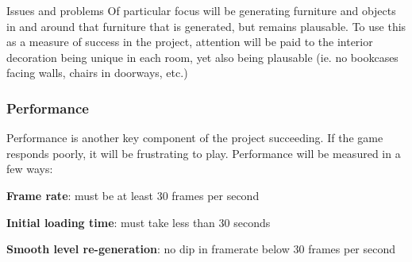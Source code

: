 \documentclass[progress]{cmpreport}
\begin{document}
\begin{section}{Issues and problems}
Of particular focus will be generating furniture and objects in and around that furniture that is generated, but remains plausable. To use this as a measure of success in the project, attention will be paid to the interior decoration being unique in each room, yet also being plausable (ie. no bookcases facing walls, chairs in doorways, etc.)

\subsubsection{Performance}
Performance is another key component of the project succeeding. If the game responds poorly, it will be frustrating to play. Performance will be measured in a few ways:
\newline
\begin{compactitem}
    \item{\textbf{Frame rate}: must be at least 30 frames per second}
    \item{\textbf{Initial loading time}: must take less than 30 seconds}
    \item{\textbf{Smooth level re-generation}: no dip in framerate below 30 frames per second}
\end{compactitem}



\end{section}
\end{document}
